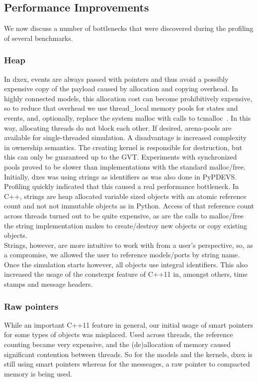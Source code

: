\subsection{Performance Improvements}
We now discuss a number of bottlenecks that were discovered during the profiling of several benchmarks.
\subsubsection{Heap}
In dxex, events are always passed with pointers and thus avoid a possibly expensive copy of the payload caused by allocation and copying overhead. In highly connected models, this allocation cost can become prohibitively expensive, so to reduce that overhead we use thread\_local memory pools for states and events, and, optionally, replace the system malloc with calls to tcmalloc~\cite{tcmalloc}. In this way, allocating threads do not block each other. If desired, arena-pools are available for single-threaded simulation. A disadvantage is increased complexity in ownership semantics. The creating kernel is responsible for destruction, but this can only be guaranteed up to the GVT. Experiments with synchronized pools proved to be slower than implementations with the standard malloc/free.\\
Initially, dxes was using strings as identifiers as was also done in PyPDEVS. Profiling quickly indicated that this caused a real performance bottleneck. In C++, strings are heap allocated variable sized objects with an atomic reference count and not not immutable objects as in Python. Access of that reference count across threads turned out to be quite expensive, as are the calls to malloc/free the string implementation makes to create/destroy new objects or copy existing objects.\\
Strings, however, are more intuitive to work with from a user's perspective, so, as a compromise, we allowed the user to reference models/ports by string name. Once the simulation starts however, all objects use integral identifiers. This also increased the usage of the constexpr feature of C++11 in, amongst others, time stamps and message headers.
\subsubsection{Raw pointers}
While an important C++11 feature in general, our initial usage of smart pointers for some types of objects was misplaced. Used across threads, the reference counting became very expensive, and the (de)allocation of memory caused significant contention between threads. So for the models and the kernels, dxex is still using smart pointers whereas for the messeages, a raw pointer to compacted memory is being used. 
